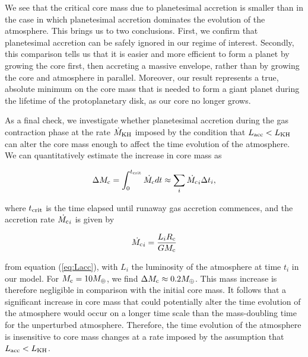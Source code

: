 \documentclass[apj]{emulateapj}
\newcommand{\co}{_{\rm c}}
\begin{document}
We see that the critical core mass due to planetesimal accretion is smaller than in the case in which planetesimal accretion dominates the evolution of the atmosphere. This brings us to two conclusions. First, we confirm that planetesimal accretion can be safely ignored in our regime of interest. Secondly, this comparison tells us that it is easier and more efficient to form a planet by growing the core first, then accreting a massive envelope, rather than by growing the core and atmosphere in parallel. Moreover, our result represents a true, absolute minimum on the core mass that is needed to form a giant planet during the lifetime of the protoplanetary disk, as our core no longer grows.



As a final check, we investigate whether planetesimal accretion during the gas contraction phase at the rate $\dot{M}_{\rm{KH}}$ imposed by the condition that $L_{\rm{acc}}<L_{\rm{KH}}$ can alter the core mass enough to affect the time evolution of the atmosphere. We can quantitatively estimate the increase in core mass as 

\begin{equation}
\label{eq:cminc}
\Delta M_{\rm{c}} = \int_0^{t_{\rm{crit}}} \dot{M_{\rm{c}}} dt \approx \sum_i \dot{M_{\rm{c}}}_i \Delta t_i,
\end{equation}
 
 \noindent where $t_{\rm{crit}}$ is the time elapsed until runaway gas accretion commences, and the accretion rate $ \dot{M_{\rm{c}}}_i $ is given by 
 
 \begin{equation}
 \label{eq:Mdotexp}
 \dot{M_{\rm{c}}}_i =\frac{L_i R\co}{G M_{\rm{c}}} 
 \end{equation}
 
 \noindent from equation (\ref{eq:Lacc}), with $L_i$ the luminosity of the atmosphere at time $t_i$ in our model. For $M_{\rm{c}}=10 M_{\oplus}$, we find $\Delta M_{\rm{c}} \approx 0.2 M_{\oplus}$. This mass increase is therefore negligible in comparison with the initial core mass. It follows that a significant increase in core mass that could potentially alter the time evolution of the atmosphere would occur on a longer time scale than the mass-doubling time for the unperturbed atmosphere. Therefore, the time evolution of the atmosphere is insensitive to core mass changes at a rate imposed by the assumption that $L_{\rm{acc}}<L_{\rm{KH}}$.
\end{document}
